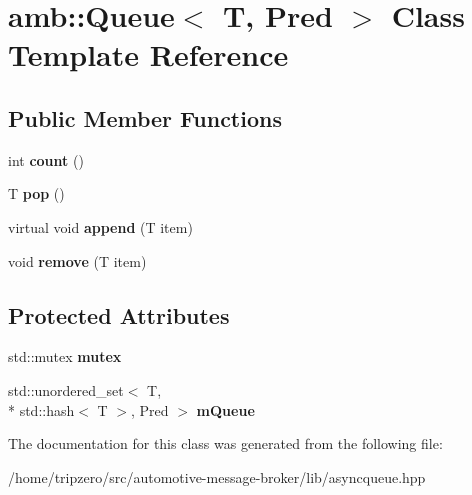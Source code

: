 \hypertarget{classamb_1_1Queue}{\section{amb\-:\-:Queue$<$ T, Pred $>$ Class Template Reference}
\label{classamb_1_1Queue}
}
\subsection*{Public Member Functions}
\begin{DoxyCompactItemize}
\item 
\hypertarget{classamb_1_1Queue_ab3896fe943b628902a5148a4fa7cb61a}{int {\bfseries count} ()}\label{classamb_1_1Queue_ab3896fe943b628902a5148a4fa7cb61a}

\item 
\hypertarget{classamb_1_1Queue_ac837c984d97965ab1f584462441509cc}{T {\bfseries pop} ()}\label{classamb_1_1Queue_ac837c984d97965ab1f584462441509cc}

\item 
\hypertarget{classamb_1_1Queue_a723ec2204cc96eb51d1cbda721000503}{virtual void {\bfseries append} (T item)}\label{classamb_1_1Queue_a723ec2204cc96eb51d1cbda721000503}

\item 
\hypertarget{classamb_1_1Queue_a67967c4d70037e3b02365bdcce4dbb52}{void {\bfseries remove} (T item)}\label{classamb_1_1Queue_a67967c4d70037e3b02365bdcce4dbb52}

\end{DoxyCompactItemize}
\subsection*{Protected Attributes}
\begin{DoxyCompactItemize}
\item 
\hypertarget{classamb_1_1Queue_a8ac352d50bc26d93de0340bd16896a35}{std\-::mutex {\bfseries mutex}}\label{classamb_1_1Queue_a8ac352d50bc26d93de0340bd16896a35}

\item 
\hypertarget{classamb_1_1Queue_a3d3bd5ab679821f93ffcd51270ebc41c}{std\-::unordered\-\_\-set$<$ T, \\*
std\-::hash$<$ T $>$, Pred $>$ {\bfseries m\-Queue}}\label{classamb_1_1Queue_a3d3bd5ab679821f93ffcd51270ebc41c}

\end{DoxyCompactItemize}


The documentation for this class was generated from the following file\-:\begin{DoxyCompactItemize}
\item 
/home/tripzero/src/automotive-\/message-\/broker/lib/asyncqueue.\-hpp\end{DoxyCompactItemize}
